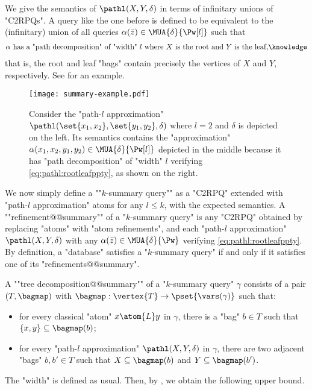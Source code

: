 We give the semantics of $\pathl(X, Y, \delta)$ in terms of infinitary unions of "C2RPQs".
A query like the one before is defined to be equivalent to the (infinitary) union of all queries $\alpha(\bar z) \in \MUA{\delta}{\Pw[l]}$ such that
\begin{align}
	\text{$\alpha$ has a "path decomposition" of "width" $l$ where $X$ is the root and $Y$ is the leaf,}\AP\label{eq:pathl:rootleafppty}
\end{align}
that is, the root and leaf "bags" contain precisely the vertices of $X$ and $Y$, respectively.
 See  for an example.
\begin{figure}
  \centering
  \texttt{[image: summary-example.pdf]}
  \caption{
	\AP\label{fig:l-path-example}
	Consider the "path-$l$ approximation" $\pathl(\set{x_1,x_2}, \set{y_1,y_2},\delta)$ where $l=2$ and $\delta$ is depicted on the left. Its semantics contains the "approximation" $\alpha(x_1,x_2,y_1,y_2) \in \MUA{\delta}{\Pw[l]}$ depicted in the middle because it has "path decomposition" of "width" $l$ verifying \eqref{eq:pathl:rootleafppty}, as shown on the right.
	}
\end{figure}

\AP We now simply define a ""$k$-summary query"" as a "C2RPQ" extended with "path-$l$ approximation" atoms for any $l\leq k$, with the expected semantics.
A \AP""refinement@@summary"" of a "$k$-summary query" is any "C2RPQ" obtained by
replacing "atoms" with "atom refinements", and 
each "path-$l$ approximation" $\pathl(X, Y, \delta)$ with any
$\alpha(\bar z) \in \MUA{\delta}{\Pw}$ verifying \eqref{eq:pathl:rootleafppty}. By definition,
a "database" satisfies a "$k$-summary query" if and only if it
satisfies one of its "refinements@@summary".

A \AP ""tree decomposition@@summary"" of a "$k$-summary query" $\gamma$ consists of
a pair $(T, \bagmap)$ with $\bagmap: \vertex{T} \to \pset{\vars(\gamma)}$
such that:
\begin{itemize}
	\item for every classical "atom" $x \atom{L} y$ in $\gamma$,
		there is a "bag" $b \in T$ such that $\{x,y\} \subseteq \bagmap(b)$;
	\item for every "path-$l$ approximation" $\pathl(X, Y, \delta)$ in $\gamma$,
		there are two adjacent "bags" $b, b' \in T$ such that $X \subseteq \bagmap(b)$
		and $Y \subseteq \bagmap(b')$.
\end{itemize}
The "width" is defined as usual. Then, by
, we obtain the following upper bound.

